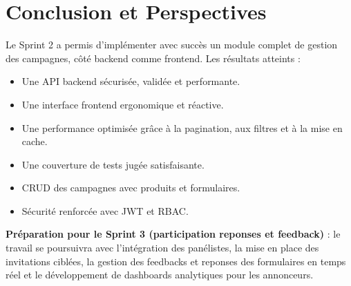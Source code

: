 \section{Conclusion et Perspectives}
Le Sprint 2 a permis d’implémenter avec succès un module complet de gestion des campagnes, côté backend comme frontend.\newline
Les résultats atteints :
\begin{itemize}[label=\textbullet]
    \item Une API backend sécurisée, validée et performante.
    \item Une interface frontend ergonomique et réactive.
    \item Une performance optimisée grâce à la pagination, aux filtres et à la mise en cache.
    \item Une couverture de tests jugée satisfaisante.
      \item CRUD des campagnes avec produits et formulaires.
    \item Sécurité renforcée avec JWT et RBAC.

\end{itemize}

\textbf{Préparation pour le Sprint 3 (participation reponses et feedback)} : le travail se poursuivra avec l’intégration des panélistes, la mise en place des invitations ciblées,
la gestion des feedbacks et reponses des formulaires en temps réel et le développement de dashboards analytiques pour les annonceurs.


